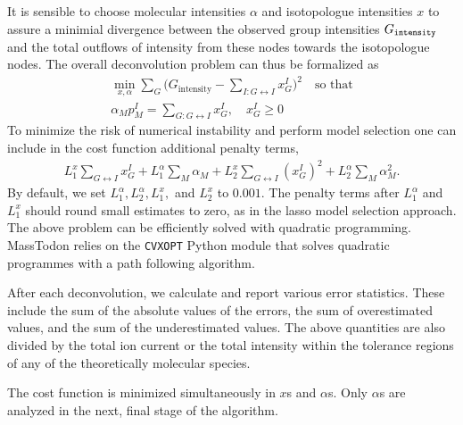\documentclass[journal=ancham, manuscript=article, layout=twocolumn]{achemso}
\begin{document}
It is sensible to choose molecular intensities $\alpha$ and isotopologue intensities $x$ to assure a minimial divergence between the observed group intensities $G_\text{\tt intensity}$ and the total outflows of intensity from these nodes towards the isotopologue nodes.
The overall deconvolution problem can thus be formalized as 
\begin{align*}
	\min_{x,\alpha} \sum_{G} \big(G_\text{intensity} - \sum_{I: G\leftrightarrow I} x^I_G \big)^2\quad\text{so that}\\
    \alpha_M p_M^I = \sum_{G: G \leftrightarrow I} x^I_G, \quad x^I_G \geq 0
\end{align*}
To minimize the risk of numerical instability and perform model selection one can include in the cost function additional penalty terms\cite{james2013introduction},
{\footnotesize\begin{align*}
     L_1^x \sum_{G\leftrightarrow I} x^I_G + L_1^\alpha \sum_M \alpha_M + L_2^x \sum_{G\leftrightarrow I} (x^I_G)^2 + L_2^\alpha \sum_M \alpha_M^2.
 \end{align*}}  
By default, we set $L_1^\alpha, L_2^\alpha, L_1^x,$ and $L_2^x$ to $0.001$.
The penalty terms after $L_1^\alpha$ and $L_1^x$  should round small estimates to zero, as in the lasso model selection approach\cite{james2013introduction}.
The above problem can be efficiently solved with quadratic programming. 
MassTodon relies on the {\tt CVXOPT} Python module\cite{andersen2013cvxopt} that
solves quadratic programmes with a path following algorithm. 

After each deconvolution, we calculate and report various error statistics. 
These include the sum of the absolute values of the errors, the sum of overestimated values, and the sum of the underestimated values. 
The above quantities are also divided by the total ion current or the total intensity within the tolerance regions of any of the theoretically molecular species.

The cost function is minimized simultaneously in $x$s and $\alpha$s. 
Only $\alpha$s are analyzed in the next, final stage of the algorithm.
\end{document}
